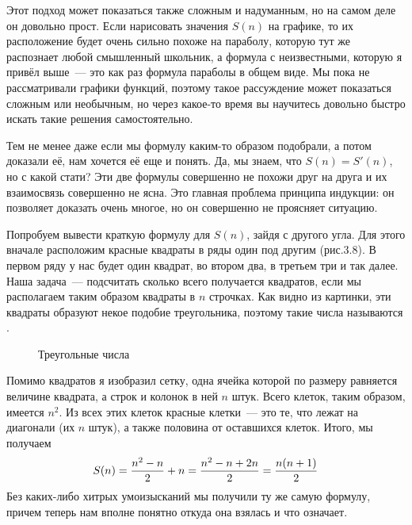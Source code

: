 Этот подход может показаться также сложным и надуманным, но на самом деле он довольно прост. Если нарисовать значения $S(n)$ на графике, то их расположение будет очень сильно похоже на параболу, которую тут же распознает любой смышленный школьник, а формула с неизвестными, которую я привёл выше~--- это как раз формула параболы в общем виде. Мы пока не рассматривали графики функций, поэтому такое рассуждение может показаться сложным или необычным, но через какое-то время вы научитесь довольно быстро искать такие решения самостоятельно.

Тем не менее даже если мы формулу каким-то образом подобрали, а потом доказали её, нам хочется её еще и понять. Да, мы знаем, что $S(n)=S'(n)$, но с какой стати? Эти две формулы совершенно не похожи друг на друга и их взаимосвязь совершенно не ясна. Это главная проблема принципа индукции: он позволяет доказать очень многое, но он совершенно не проясняет ситуацию.

Попробуем вывести краткую формулу для $S(n)$, зайдя с другого угла. Для этого вначале расположим красные квадраты в ряды один под другим (рис.3.8). В первом ряду у нас будет один квадрат, во втором два, в третьем три и так далее. Наша задача~--- подсчитать сколько всего получается квадратов, если мы располагаем таким образом квадраты в $n$ строчках. Как видно из картинки, эти квадраты образуют некое подобие треугольника, поэтому такие числа называются .

\begin{figure}[h]
\centering
{}
\caption{Треугольные числа}
\end{figure}

Помимо квадратов я изобразил сетку, одна ячейка которой по размеру равняется величине квадрата, а строк и колонок в ней $n$ штук. Всего клеток, таким образом, имеется $n^2$. Из всех этих клеток красные клетки~--- это те, что лежат на диагонали (их $n$ штук), а также половина от оставшихся клеток. Итого, мы получаем
$$S(n) = {n^2 - n\over 2} + n = {n^2 - n + 2n \over 2} = {n(n+1)\over 2}$$
Без каких-либо хитрых умоизысканий мы получили ту же самую формулу, причем теперь нам вполне понятно откуда она взялась и что означает.

